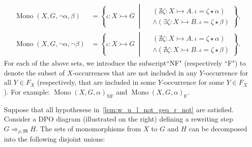 \begin{notation}
\begin{align*}
        \\
        \operatorname{Mono}(X,G,\lnot \alpha, \beta) &= \left\{ 
            \iota \colon X \rightarrowtail G \;\middle|\; 
                \begin{aligned}  
                    &(\nexists \zeta \colon X \rightarrowtail A.\, \iota = \zeta \star \alpha) \\ 
                    &\land (\exists \zeta \colon X \rightarrowtail B.\, \iota = \zeta \star \beta)
                \end{aligned}
        \right\},
        \\
        \operatorname{Mono}(X,G,\lnot \alpha, \lnot \beta) &= \left\{ 
            \iota \colon X \rightarrowtail G \;\middle|\; 
                \begin{aligned}
                    &(\nexists \zeta \colon X \rightarrowtail A.\, \iota = \zeta \star \alpha) \\
                    &\land (\nexists \zeta \colon X \rightarrowtail B.\, \iota = \zeta \star \beta)
                \end{aligned}
        \right\}.
    \end{align*}
    For each of the above sets, we introduce the subscript``NF" (respectively ``F") to denote the subset of \( X \)-occurrences that are not included in any \( Y \)-occurrence for all \( Y \in F_X \) (respectively, that are included in some \( Y \)-occurrence for some \( Y \in F_X \)). For example: \( \operatorname{Mono}(X, G, \alpha)_{\text{NF}} \) and \( \operatorname{Mono}(X, G, \alpha)_{\text{F}} \).
\end{notation}
\noindent
\begin{minipage}{0.7\textwidth}\setlength{\parindent}{1em}
    Suppose that all hypothesese in~\autoref{lem:w_u_l_not_geq_r_not} are satisfied. Consider a DPO diagram (illustrated on the right) defining a rewriting step \( G \Rightarrow_{\rho,\mathfrak{M}} H \). 
    The sets of monomorphisms from \( X \) to \( G \) and \( H \) can be decomposed into the following disjoint unions:
\end{minipage}%
\begin{minipage}{0.29\textwidth}
    \hfill
\end{minipage}

